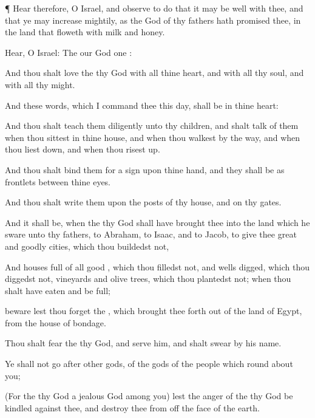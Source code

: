 {\par }{\PP {}¶
Hear therefore, O
Israel, and
observe to
do
{} that it may be
well with thee, and that ye may
increase
mightily, as the
{}
God of thy
fathers hath
promised thee, in the
land that
floweth with
milk and
honey.


\par }{\PP {}Hear, O
Israel: The
{} our
God
{}
one
{}:

And thou shalt
love the
{} thy
God with all thine
heart, and with all thy
soul, and with all thy
might.

And these
words, which I
command thee this
day, shall be in thine
heart:

And thou shalt teach them
diligently unto thy
children, and shalt
talk of them when thou
sittest in thine
house, and when thou
walkest by the
way, and when thou liest
down, and when thou risest
up.

And thou shalt
bind them for a
sign upon thine
hand, and they shall be as
frontlets between thine
eyes.

And thou shalt
write them upon the
posts of thy
house, and on thy
gates.

And it shall be, when the
{} thy
God shall have
brought thee into the
land which he
sware unto thy
fathers, to
Abraham, to
Isaac, and to
Jacob, to
give thee
great and
goodly
cities, which thou
buildedst not,

And
houses
full of all
good
{}, which thou
filledst not, and
wells
digged, which thou
diggedst not,
vineyards and olive
trees, which thou
plantedst not; when thou shalt have
eaten and be
full;

beware lest thou
forget the
{}, which brought thee
forth out of the
land of
Egypt, from the
house of
bondage.

Thou shalt
fear the
{} thy
God, and
serve him, and shalt
swear by his
name.

Ye shall not
go
after
other
gods, of the
gods of the
people which
{} round
about you;

(For the
{} thy
God
{} a
jealous
God
among you) lest the
anger of the
{} thy
God be
kindled against thee, and
destroy thee from off the
face of the
earth.


}

